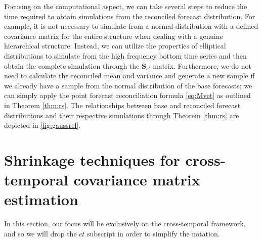 \documentclass[a4paper,11pt]{article}
\newcommand{\Svet}{\bm{S}}
\theoremstyle{definition}
\begin{document}


Focusing on the computational aspect, we can take several steps to reduce the time required to obtain simulations from the reconciled forecast distribution. For example, it is not necessary to simulate from a normal distribution with a defined covariance matrix for the entire structure when dealing with a genuine hierarchical structure. Instead, we can utilize the properties of elliptical distributions to simulate from the high frequency bottom time series and then obtain the complete simulation through the $\Svet_{ct}$ matrix. Furthermore, we do not need to calculate the reconciled mean and variance and generate a new sample if we already have a sample from the normal distribution of the base forecasts; we can simply apply the point forecast reconciliation formula \eqref{eq:Mvet} as outlined in Theorem \ref{thm:rs}. The relationships between base and reconciled forecast distributions and their respective simulations through Theorem \ref{thm:rs} are depicted in \autoref{fig:gaussrel}.

\section{Shrinkage techniques for cross-temporal covariance matrix estimation}\label{sec:shrtech}

In this section, our focus will be exclusively on the cross-temporal framework, and so  we will drop the $ct$ subscript in order to simplify the notation.
\end{document}
